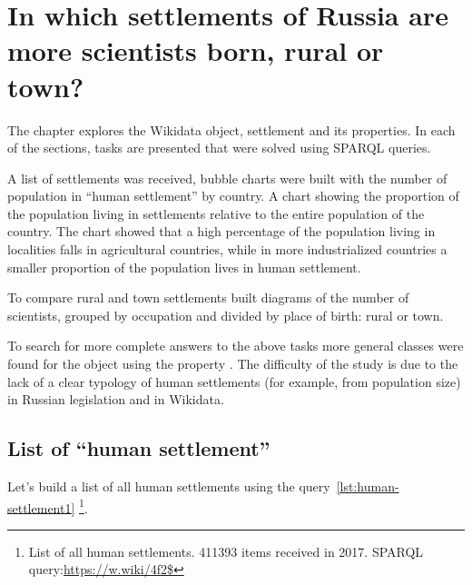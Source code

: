 \setchapterpreamble[u]{\margintoc}
\chapter[In which settlements of Russia are more scientists born, rural or town?]{In which settlements of Russia are more scientists born, rural or town?\protect\footnotemark}


The chapter explores the Wikidata object,  settlement and its properties. In each of the sections, 
tasks are presented that were solved using SPARQL queries.

A list of settlements was received,
bubble charts were built with the number of population in ``human settlement'' by country.
A chart showing the proportion of the population
living in settlements relative to the entire population of the country.
The chart showed that a high percentage of the population living in localities
falls in agricultural countries, while in more industrialized countries
a smaller proportion of the population lives in human settlement.

To compare rural and town settlements
built diagrams of the number of scientists, grouped by occupation
and divided by place of birth: rural or town.

To search for more complete answers to the above tasks
more general classes were found for the object 
using the property .
The difficulty of the study is due to the lack of a clear typology of human settlements
(for example, from population size) in Russian legislation and in Wikidata.

\section{List of ``human settlement''}

Let's build a list of all human settlements using the query~\ref{lst:human-settlement1} \footnote{List of all human settlements. \num{411393} items received in 2017. SPARQL query:\href{https://w.wiki/4f2\$}{https://w.wiki/4f2\$}}.

